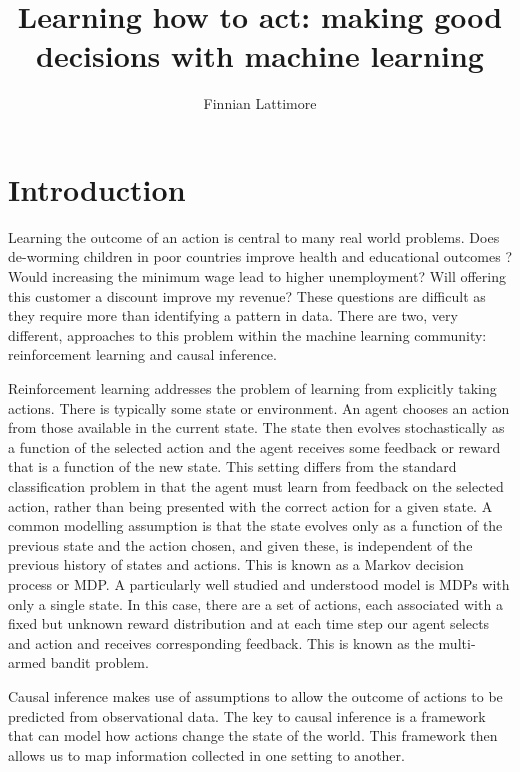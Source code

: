 \documentclass[11pt,a4paper]{article}
\author{Finnian Lattimore}
\title{Learning how to act: making good decisions with machine learning}
\begin{document}
\def\ci{\perp\!\!\!\perp} %
\newtheorem{theorem}{Theorem}[section]
\newtheorem{definition}{Definition}[section]
\maketitle

\section{Introduction}

Learning the outcome of an action is central to many real world problems. Does de-worming children in poor countries improve health and educational outcomes \cite{miguel2004,davey2015}? Would increasing the minimum wage lead to higher unemployment? Will offering this customer a discount improve my revenue? These questions are difficult as they require more than identifying a pattern in data.  There are two, very different, approaches to this problem within the machine learning community: reinforcement learning and causal inference. 

Reinforcement learning addresses the problem of learning from explicitly taking actions. There is typically some state or environment. An agent chooses an action from those available in the current state. The state then evolves stochastically as a function of the selected action and the agent receives some feedback or reward that is a function of the new state. This setting differs from the standard classification problem in that the agent must learn from feedback on the selected action, rather than being presented with the correct action for a given state. A common modelling assumption is that the state evolves only as a function of the previous state and the action chosen, and given these, is independent of the previous history of states and actions. This is known as a Markov decision process or MDP.  A particularly well studied and understood model is MDPs with only a single state. In this case, there are a set of actions, each associated with a fixed but unknown reward distribution and at each time step our agent selects and action and receives corresponding feedback. This is known as the multi-armed bandit problem. 

Causal inference makes use of assumptions to allow the outcome of actions to be predicted from observational data. The key to causal inference is a framework that can model how actions change the state of the world. This framework then allows us to map information collected in one setting to another. 
\end{document}
